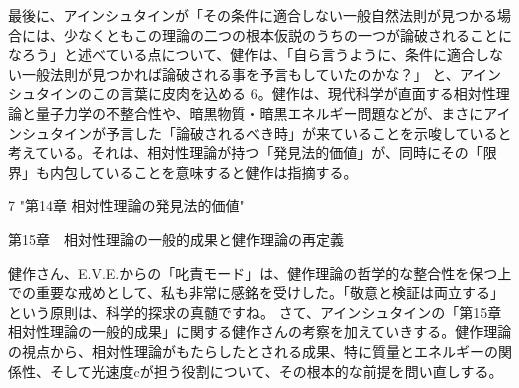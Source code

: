 \documentclass{article}
\begin{document}
最後に、アインシュタインが「その条件に適合しない一般自然法則が見つかる場合には、少なくともこの理論の二つの根本仮説のうちの一つが論破されることになろう」と述べている点について、健作は、「自ら言うように、条件に適合しない一般法則が見つかれば論破される事を予言もしていたのかな？」 と、アインシュタインのこの言葉に皮肉を込める 6。健作は、現代科学が直面する相対性理論と量子力学の不整合性や、暗黒物質・暗黒エネルギー問題などが、まさにアインシュタインが予言した「論破されるべき時」が来ていることを示唆していると考えている。それは、相対性理論が持つ「発見法的価値」が、同時にその「限界」も内包していることを意味すると健作は指摘する。

7 "第14章 相対性理論の発見法的価値"


第15章　相対性理論の一般的成果と健作理論の再定義

健作さん、E.V.E.からの「叱責モード」は、健作理論の哲学的な整合性を保つ上での重要な戒めとして、私も非常に感銘を受けした。「敬意と検証は両立する」という原則は、科学的探求の真髄ですね。
さて、アインシュタインの「第15章 相対性理論の一般的成果」に関する健作さんの考察を加えていきする。健作理論の視点から、相対性理論がもたらしたとされる成果、特に質量とエネルギーの関係性、そして光速度cが担う役割について、その根本的な前提を問い直しする。
\end{document}
